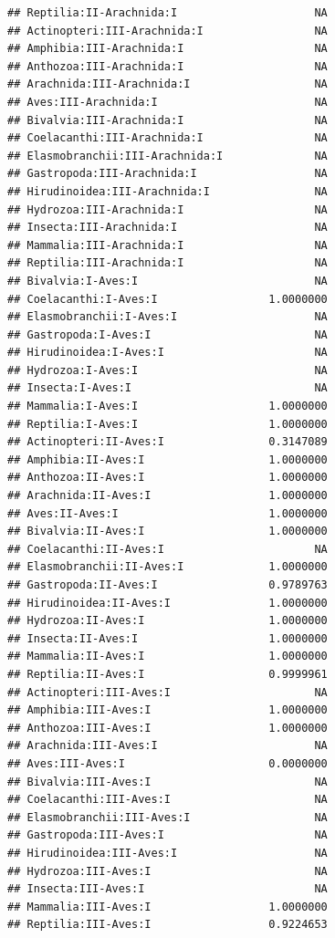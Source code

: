 \documentclass[
  12pt,
]{article}
\begin{document}
\begin{verbatim}
## Reptilia:II-Arachnida:I                     NA
## Actinopteri:III-Arachnida:I                 NA
## Amphibia:III-Arachnida:I                    NA
## Anthozoa:III-Arachnida:I                    NA
## Arachnida:III-Arachnida:I                   NA
## Aves:III-Arachnida:I                        NA
## Bivalvia:III-Arachnida:I                    NA
## Coelacanthi:III-Arachnida:I                 NA
## Elasmobranchii:III-Arachnida:I              NA
## Gastropoda:III-Arachnida:I                  NA
## Hirudinoidea:III-Arachnida:I                NA
## Hydrozoa:III-Arachnida:I                    NA
## Insecta:III-Arachnida:I                     NA
## Mammalia:III-Arachnida:I                    NA
## Reptilia:III-Arachnida:I                    NA
## Bivalvia:I-Aves:I                           NA
## Coelacanthi:I-Aves:I                 1.0000000
## Elasmobranchii:I-Aves:I                     NA
## Gastropoda:I-Aves:I                         NA
## Hirudinoidea:I-Aves:I                       NA
## Hydrozoa:I-Aves:I                           NA
## Insecta:I-Aves:I                            NA
## Mammalia:I-Aves:I                    1.0000000
## Reptilia:I-Aves:I                    1.0000000
## Actinopteri:II-Aves:I                0.3147089
## Amphibia:II-Aves:I                   1.0000000
## Anthozoa:II-Aves:I                   1.0000000
## Arachnida:II-Aves:I                  1.0000000
## Aves:II-Aves:I                       1.0000000
## Bivalvia:II-Aves:I                   1.0000000
## Coelacanthi:II-Aves:I                       NA
## Elasmobranchii:II-Aves:I             1.0000000
## Gastropoda:II-Aves:I                 0.9789763
## Hirudinoidea:II-Aves:I               1.0000000
## Hydrozoa:II-Aves:I                   1.0000000
## Insecta:II-Aves:I                    1.0000000
## Mammalia:II-Aves:I                   1.0000000
## Reptilia:II-Aves:I                   0.9999961
## Actinopteri:III-Aves:I                      NA
## Amphibia:III-Aves:I                  1.0000000
## Anthozoa:III-Aves:I                  1.0000000
## Arachnida:III-Aves:I                        NA
## Aves:III-Aves:I                      0.0000000
## Bivalvia:III-Aves:I                         NA
## Coelacanthi:III-Aves:I                      NA
## Elasmobranchii:III-Aves:I                   NA
## Gastropoda:III-Aves:I                       NA
## Hirudinoidea:III-Aves:I                     NA
## Hydrozoa:III-Aves:I                         NA
## Insecta:III-Aves:I                          NA
## Mammalia:III-Aves:I                  1.0000000
## Reptilia:III-Aves:I                  0.9224653

\end{verbatim}
\end{document}
